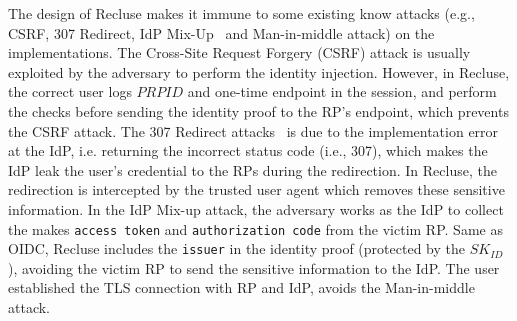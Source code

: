 The design of Recluse makes it immune to some existing know attacks (e.g., CSRF, 307 Redirect, IdP Mix-Up~\cite{FettKS16} and Man-in-middle attack) on the implementations. The Cross-Site Request Forgery (CSRF) attack is  usually exploited by the adversary to perform the identity injection. However, in Recluse, the correct user logs  $PRPID$ and one-time endpoint in the session,  and perform the checks before sending the identity proof to the RP's endpoint, which prevents the CSRF attack.  The 307 Redirect attacks~\cite{FettKS16} is due to the implementation error at the IdP, i.e. returning the incorrect status code (i.e., 307), which makes the IdP leak the user's credential to the RPs during the redirection. In Recluse, the redirection is intercepted by the trusted user agent which removes these sensitive information. In the IdP Mix-up attack, the adversary works as the IdP to collect the  makes \verb+access token+ and \verb+authorization code+  from the victim RP. Same as OIDC, Recluse includes the \verb+issuer+ in the identity proof (protected by the $SK_{ID}$), avoiding the victim RP to send the sensitive information to the IdP. The user established the TLS connection with RP and IdP, avoids the Man-in-middle attack.

